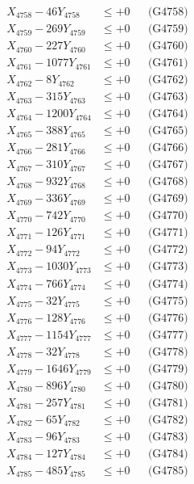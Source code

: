 \documentclass[a4paper,10pt]{article}
\begin{document}
{\begin{align}
X_{4758} - 46Y_{4758} &\leq +0 && \text{(G4758)} \\
X_{4759} - 269Y_{4759} &\leq +0 && \text{(G4759)} \\
X_{4760} - 227Y_{4760} &\leq +0 && \text{(G4760)} \\
\allowbreak
X_{4761} - 1077Y_{4761} &\leq +0 && \text{(G4761)} \\
X_{4762} - 8Y_{4762} &\leq +0 && \text{(G4762)} \\
X_{4763} - 315Y_{4763} &\leq +0 && \text{(G4763)} \\
X_{4764} - 1200Y_{4764} &\leq +0 && \text{(G4764)} \\
X_{4765} - 388Y_{4765} &\leq +0 && \text{(G4765)} \\
X_{4766} - 281Y_{4766} &\leq +0 && \text{(G4766)} \\
X_{4767} - 310Y_{4767} &\leq +0 && \text{(G4767)} \\
X_{4768} - 932Y_{4768} &\leq +0 && \text{(G4768)} \\
X_{4769} - 336Y_{4769} &\leq +0 && \text{(G4769)} \\
X_{4770} - 742Y_{4770} &\leq +0 && \text{(G4770)} \\
\allowbreak
X_{4771} - 126Y_{4771} &\leq +0 && \text{(G4771)} \\
X_{4772} - 94Y_{4772} &\leq +0 && \text{(G4772)} \\
X_{4773} - 1030Y_{4773} &\leq +0 && \text{(G4773)} \\
X_{4774} - 766Y_{4774} &\leq +0 && \text{(G4774)} \\
X_{4775} - 32Y_{4775} &\leq +0 && \text{(G4775)} \\
X_{4776} - 128Y_{4776} &\leq +0 && \text{(G4776)} \\
X_{4777} - 1154Y_{4777} &\leq +0 && \text{(G4777)} \\
X_{4778} - 32Y_{4778} &\leq +0 && \text{(G4778)} \\
X_{4779} - 1646Y_{4779} &\leq +0 && \text{(G4779)} \\
X_{4780} - 896Y_{4780} &\leq +0 && \text{(G4780)} \\
\allowbreak
X_{4781} - 257Y_{4781} &\leq +0 && \text{(G4781)} \\
X_{4782} - 65Y_{4782} &\leq +0 && \text{(G4782)} \\
X_{4783} - 96Y_{4783} &\leq +0 && \text{(G4783)} \\
X_{4784} - 127Y_{4784} &\leq +0 && \text{(G4784)} \\
X_{4785} - 485Y_{4785} &\leq +0 && \text{(G4785)} \\

\end{align}}
\end{document}
